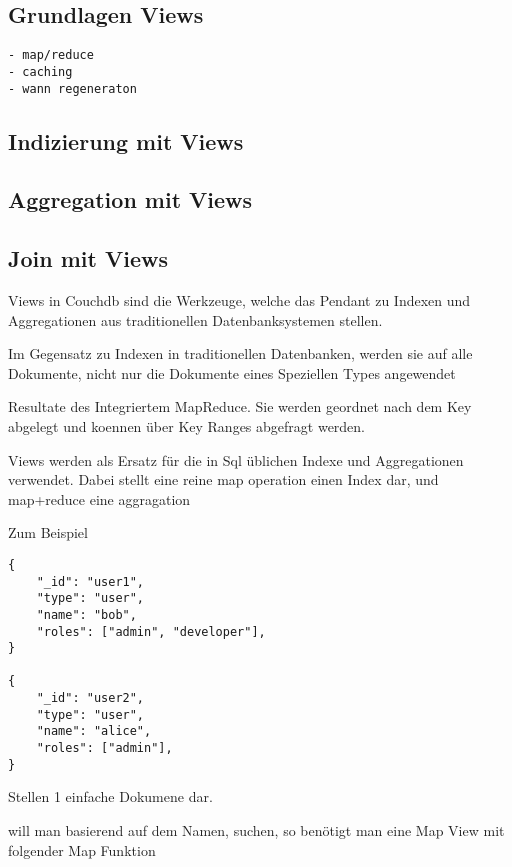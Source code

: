 \subsection{Grundlagen Views}

\begin{verbatim}
- map/reduce
- caching
- wann regeneraton

\end{verbatim}

\subsection{Indizierung mit Views}



\subsection{Aggregation mit Views}
\subsection{Join mit Views}



Views in Couchdb sind die Werkzeuge,
welche das Pendant zu Indexen und Aggregationen
aus traditionellen Datenbanksystemen stellen.

Im Gegensatz zu Indexen in traditionellen Datenbanken, werden sie auf alle Dokumente,
nicht nur die Dokumente eines Speziellen Types angewendet


Resultate des Integriertem MapReduce.
Sie werden geordnet nach dem Key abgelegt und koennen über Key Ranges abgefragt werden.


Views werden als Ersatz für die in Sql üblichen Indexe und Aggregationen verwendet.
Dabei stellt eine  reine map operation einen Index dar, und map+reduce eine aggragation

\newpage
Zum Beispiel

\begin{verbatim}
{
    "_id": "user1",
    "type": "user",
    "name": "bob",
    "roles": ["admin", "developer"],
}

{
    "_id": "user2",
    "type": "user",
    "name": "alice",
    "roles": ["admin"],
}
\end{verbatim}


Stellen 1 einfache Dokumene dar.

will man basierend auf dem Namen, suchen, so benötigt man eine Map View mit folgender Map Funktion

